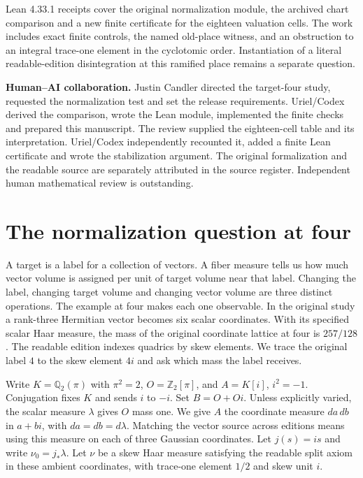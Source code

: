 \documentclass[12pt,letterpaper]{article}
\begin{document}
Lean 4.33.1 receipts cover the original normalization module, the archived chart comparison and a new finite certificate for the eighteen valuation cells. The work includes exact finite controls, the named old-place witness, and an obstruction to an integral trace-one element in the cyclotomic order. Instantiation of a literal readable-edition disintegration at this ramified place remains a separate question.

\medskip\textbf{Human--AI collaboration.} Justin Candler directed the target-four study, requested the normalization test and set the release requirements. Uriel/Codex derived the comparison, wrote the Lean module, implemented the finite checks and prepared this manuscript. The review supplied the eighteen-cell table and its interpretation. Uriel/Codex independently recounted it, added a finite Lean certificate and wrote the stabilization argument. The original formalization and the readable source are separately attributed in the source register. Independent human mathematical review is outstanding.
\clearpage
\begingroup\small\setlength{\parskip}{0pt}\tableofcontents\endgroup
\clearpage{}
\section{The normalization question at four}
A target is a label for a collection of vectors. A fiber measure tells us how much vector volume is assigned per unit of target volume near that label. Changing the label, changing target volume and changing vector volume are three distinct operations. The example at four makes each one observable. In the original study a rank-three Hermitian vector becomes six scalar coordinates. With its specified scalar Haar measure, the mass of the original coordinate lattice at four is $257/128$. The readable edition indexes quadrics by skew elements. We trace the original label $4$ to the skew element $4i$ and ask which mass the label receives.

Write $K=\mathbb Q_2(\pi)$ with $\pi^2=2$, $O=\mathbb Z_2[\pi]$, and $A=K[i]$, $i^2=-1$. Conjugation fixes $K$ and sends $i$ to $-i$. Set $B=O+Oi$. Unless explicitly varied, the scalar measure $\lambda$ gives $O$ mass one. We give $A$ the coordinate measure $da\,db$ in $a+bi$, with $da=db=d\lambda$. Matching the vector source across editions means using this measure on each of three Gaussian coordinates. Let $j(s)=is$ and write $\nu_0=j_*\lambda$. Let $\nu$ be a skew Haar measure satisfying the readable split axiom in these ambient coordinates, with trace-one element $1/2$ and skew unit $i$.
\end{document}

